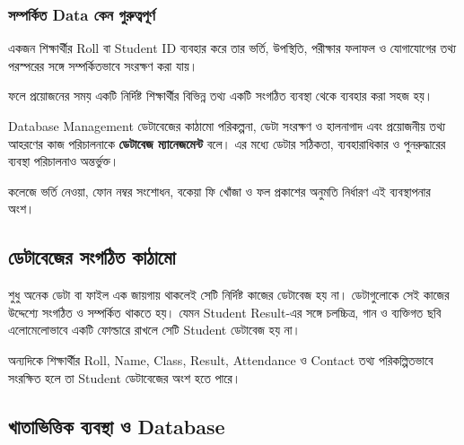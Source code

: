 \noindent

\subsubsection{সম্পর্কিত Data কেন গুরুত্বপূর্ণ}
একজন শিক্ষার্থীর Roll বা Student ID ব্যবহার করে তার ভর্তি,
উপস্থিতি, পরীক্ষার ফলাফল ও যোগাযোগের তথ্য পরস্পরের সঙ্গে
সম্পর্কিতভাবে সংরক্ষণ করা যায়।

ফলে প্রয়োজনের সময় একটি নির্দিষ্ট শিক্ষার্থীর বিভিন্ন তথ্য
একটি সংগঠিত ব্যবস্থা থেকে ব্যবহার করা সহজ হয়।

\begin{definitionbox}{Database Management}
ডেটাবেজের কাঠামো পরিকল্পনা, ডেটা সংরক্ষণ ও হালনাগাদ এবং প্রয়োজনীয় তথ্য আহরণের কাজ পরিচালনাকে \textbf{ডেটাবেজ ম্যানেজমেন্ট} বলে। এর মধ্যে ডেটার সঠিকতা, ব্যবহারাধিকার ও পুনরুদ্ধারের ব্যবস্থা পরিচালনাও অন্তর্ভুক্ত।
\end{definitionbox}
কলেজে ভর্তি নেওয়া, ফোন নম্বর সংশোধন, বকেয়া ফি খোঁজা ও ফল প্রকাশের অনুমতি নির্ধারণ এই ব্যবস্থাপনার অংশ।
\subsection{ডেটাবেজের সংগঠিত কাঠামো}

শুধু অনেক ডেটা বা ফাইল এক জায়গায় থাকলেই সেটি নির্দিষ্ট কাজের ডেটাবেজ হয় না। ডেটাগুলোকে সেই কাজের উদ্দেশ্যে সংগঠিত ও সম্পর্কিত থাকতে হয়। যেমন Student Result-এর সঙ্গে চলচ্চিত্র, গান ও ব্যক্তিগত ছবি এলোমেলোভাবে একটি ফোল্ডারে রাখলে সেটি Student ডেটাবেজ হয় না।

অন্যদিকে শিক্ষার্থীর Roll, Name, Class, Result, Attendance
ও Contact তথ্য পরিকল্পিতভাবে সংরক্ষিত হলে তা
Student ডেটাবেজের অংশ হতে পারে।

\subsection{খাতাভিত্তিক ব্যবস্থা ও Database}

